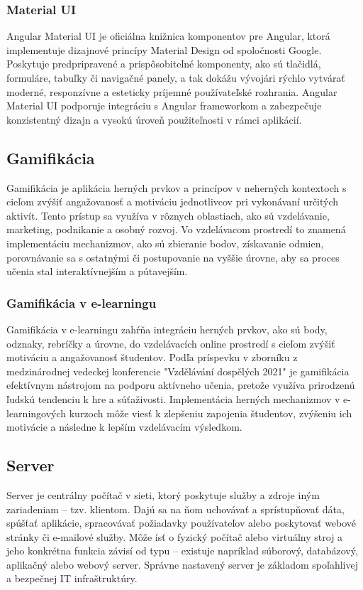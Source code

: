  \subsubsection{Material UI}
 Angular Material UI je oficiálna knižnica komponentov pre Angular, ktorá implementuje dizajnové princípy Material Design od spoločnosti Google. 
 Poskytuje predpripravené a prispôsobiteľné komponenty, ako sú tlačidlá, formuláre, tabuľky či navigačné panely, a tak dokážu vývojári rýchlo vytvárať moderné, responzívne a esteticky príjemné používateľské rozhrania.
  Angular Material UI podporuje integráciu s Angular frameworkom a zabezpečuje konzistentný dizajn a vysokú úroveň použiteľnosti v rámci aplikácií. \cite{materialUI}

\subsection{Gamifikácia}
Gamifikácia je aplikácia herných prvkov a princípov v neherných kontextoch s cieľom zvýšiť angažovanosť a motiváciu jednotlivcov pri vykonávaní určitých aktivít.
 Tento prístup sa využíva v rôznych oblastiach, ako sú vzdelávanie, marketing, podnikanie a osobný rozvoj.
Vo vzdelávacom prostredí to znamená implementáciu mechanizmov, ako sú zbieranie bodov, získavanie odmien, porovnávanie sa s ostatnými či postupovanie na vyššie úrovne, aby sa proces učenia stal interaktívnejším a pútavejším. 
\subsubsection{Gamifikácia v e-learningu}
Gamifikácia v e-learningu zahŕňa integráciu herných prvkov, ako sú body, odznaky, rebríčky a úrovne, do vzdelávacích online prostredí s cieľom zvýšiť motiváciu a angažovanosť študentov.
 Podľa príspevku v zborníku z medzinárodnej vedeckej konferencie "Vzdělávání dospělých 2021" \cite{gamifikacia} je gamifikácia efektívnym nástrojom na podporu aktívneho učenia, pretože využíva prirodzenú ľudskú tendenciu k hre a súťaživosti.
  Implementácia herných mechanizmov v e-learningových kurzoch môže viesť k zlepšeniu zapojenia študentov, zvýšeniu ich motivácie a následne k lepším vzdelávacím výsledkom.\cite{aipreklad}

\subsection{Server}
Server je centrálny počítač v sieti, ktorý poskytuje služby a zdroje iným zariadeniam – tzv. klientom. 
Dajú sa na ňom uchovávať a sprístupňovať dáta, spúšťať aplikácie, spracovávať požiadavky používateľov alebo poskytovať webové stránky či e-mailové služby.
 Môže ísť o fyzický počítač alebo virtuálny stroj a jeho konkrétna funkcia závisí od typu – existuje napríklad súborový, databázový, aplikačný alebo webový server. 
 Správne nastavený server je základom spoľahlivej a bezpečnej IT infraštruktúry.\cite{server}
